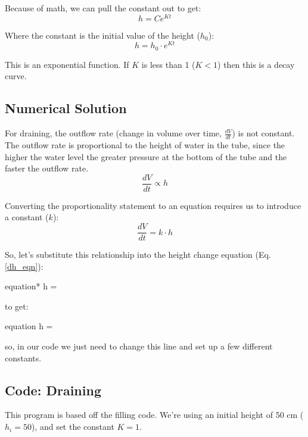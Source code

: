 \documentclass[11pt,fleqn]{article}
\begin{document}
	Because of math, we can pull the constant out to get:
	\begin{equation}
		h = Ce^{K t}
	\end{equation}

	Where the constant is the initial value of the height ($h_0$):
	\begin{equation}
		\label{analyticalDraining}
		h = h_0 \cdot e^{K t}
	\end{equation}

	This is an exponential function. If $K$ is less than 1 ($K<1$) then this is a decay curve.
	
	
	\subsection{Numerical Solution}
	
	For draining, the outflow rate (change in volume over time, $\frac{dV}{dt}$) is not constant. The outflow rate is proportional to the height of water in the tube, since the higher the water level the greater pressure at the bottom of the tube and the faster the outflow rate.
	\begin{equation}
		\frac{dV}{dt} \propto h
	\end{equation}
	
	Converting the proportionality statement to an equation requires us to introduce a constant ($k$):
	\begin{equation}
		\label{DrainingDiffEqn}
		\frac{dV}{dt} = k \cdot h
	\end{equation}

	So, let's substitute this relationship into the height change equation (Eq. \ref{dh_eqn}):
	\begin{empheq}[]{equation*}
		\Delta h = 
	\end{empheq}
	
	to get:
	\begin{empheq}[box=\fbox]{equation}
		\Delta h = 
	\end{empheq}

	so, in our code we just need to change this line and set up a few different constants.
	
	
	
	\subsection{Code: Draining}
	
	This program is based off the filling code. We're using an initial height of 50 cm ($h_i = 50$), and set the constant $K=1$.
	
\end{document}
